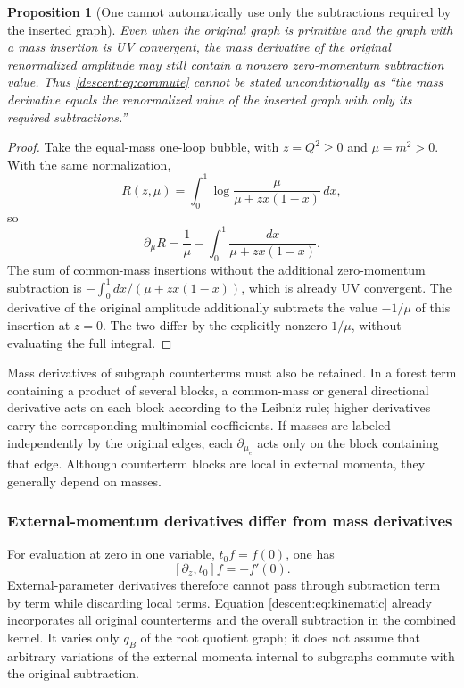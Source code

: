 \documentclass[11pt,a4paper,oneside]{article}
\theoremstyle{plain}
\newtheorem{proposition}[theorem]{Proposition}
\theoremstyle{definition}
\theoremstyle{remark}
\numberwithin{equation}{section}
\begin{document}
\begin{proposition}[One cannot automatically use only the subtractions required by the inserted graph]\label{descent:prop:oversub}
Even when the original graph is primitive and the graph with a mass insertion is UV convergent, the mass derivative of the original renormalized amplitude may still contain a nonzero zero-momentum subtraction value.
Thus \eqref{descent:eq:commute} cannot be stated unconditionally as ``the mass derivative equals the renormalized value of the inserted graph with only its required subtractions.''
\end{proposition}
\begin{proof}
Take the equal-mass one-loop bubble, with $z=Q^2\geq0$ and $\mu=m^2>0$.
With the same normalization,
\[
 R(z,\mu)=\int_0^1\log\frac{\mu}{\mu+zx(1-x)}\,dx,
\]
so
\begin{equation}\label{descent:eq:bubble}
 \partial_\mu R
   =\frac1\mu-\int_0^1\frac{dx}{\mu+zx(1-x)}.
\end{equation}
The sum of common-mass insertions without the additional zero-momentum subtraction is
$-\int_0^1dx/(\mu+zx(1-x))$, which is already UV convergent.
The derivative of the original amplitude additionally subtracts the value $-1/\mu$ of this insertion at $z=0$.
The two differ by the explicitly nonzero $1/\mu$, without evaluating the full integral.
\end{proof}

Mass derivatives of subgraph counterterms must also be retained.
In a forest term containing a product of several blocks, a common-mass or general directional derivative acts on each block according to the Leibniz rule; higher derivatives carry the corresponding multinomial coefficients.
If masses are labeled independently by the original edges, each $\partial_{\mu_e}$ acts only on the block containing that edge.
Although counterterm blocks are local in external momenta, they generally depend on masses.

\subsubsection{External-momentum derivatives differ from mass derivatives}
For evaluation at zero in one variable, $t_0f=f(0)$, one has
\begin{equation}\label{descent:eq:kincommutator}
 [\partial_z,t_0]f=-f'(0).
\end{equation}
External-parameter derivatives therefore cannot pass through subtraction term by term while discarding local terms.
Equation \eqref{descent:eq:kinematic} already incorporates all original counterterms and the overall subtraction in the combined kernel.
It varies only $q_B$ of the root quotient graph; it does not assume that arbitrary variations of the external momenta internal to subgraphs commute with the original subtraction.
\end{document}
